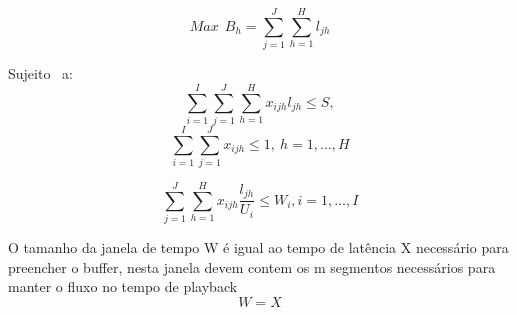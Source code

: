 \documentclass[
	12pt,
	oneside,
	a4paper,
	english,
	brazil
	]{abntex2ppgsi}
\begin{document}
\begin{equation}
Max  \ \ B_h=\sum_{j=1}^{J}\sum_{h=1}^{H}l_{jh}
\end{equation}

Sujeito \ a:
\begin{equation}
\sum_{i=1}^{I}\sum_{j=1}^{J}\sum_{h=1}^{H}x_{ijh}l_{jh} \leq S,
\end{equation}
\begin{equation}
\sum_{i=1}^{I}\sum_{j=1}^{J}x_{ijh} \leq 1 ,\ h = 1, \dots, H
\end{equation}

\begin{equation}
\sum_{j=1}^J\sum_{h=1}^{H}x_{ijh}\frac{l_{jh}}{U_i} \leq W_i ,i = 1, \dots, I
\end{equation}

O tamanho da janela de tempo W é igual ao tempo de latência X necessário para preencher o buffer, nesta janela devem contem os m segmentos necessários para manter o fluxo no tempo de playback
\begin{equation}
W = X
\end{equation}






\end{document}
